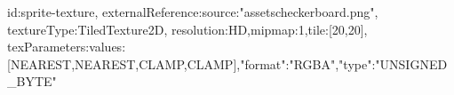 {id:sprite-texture,
externalReference:{source:"assets\/checkerboard.png"},
textureType:TiledTexture2D,
resolution:HD,mipmap:1,tile:[20,20],
texParameters:{values:[NEAREST,NEAREST,CLAMP,CLAMP]},"format":"RGBA","type":"UNSIGNED_BYTE"}